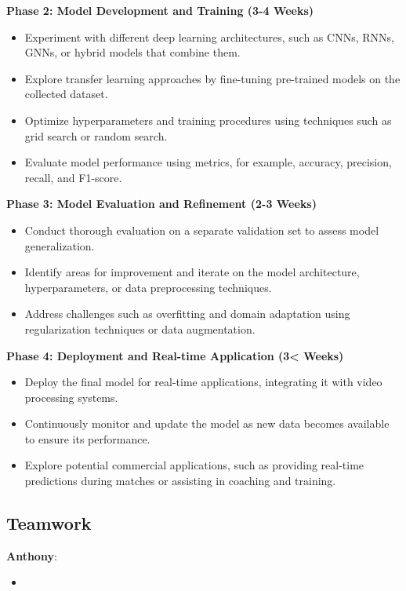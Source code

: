 \documentclass{article}
\begin{document}
{\bf{Phase 2: Model Development and Training (3-4 Weeks)}}
\begin{itemize}
    \item Experiment with different deep learning architectures, such as CNNs, RNNs, GNNs, or hybrid models that combine them.
    \item Explore transfer learning approaches by fine-tuning pre-trained models on the collected dataset.
    \item Optimize hyperparameters and training procedures using techniques such as grid search or random search.
    \item Evaluate model performance using metrics, for example, accuracy, precision, recall, and F1-score.
\end{itemize}

{\bf{Phase 3: Model Evaluation and Refinement (2-3 Weeks)}}
\begin{itemize}
    \item Conduct thorough evaluation on a separate validation set to assess model generalization.
    \item Identify areas for improvement and iterate on the model architecture, hyperparameters, or data preprocessing techniques.
    \item Address challenges such as overfitting and domain adaptation using regularization techniques or data augmentation.
\end{itemize}

{\bf{Phase 4: Deployment and Real-time Application (3< Weeks)}}
\begin{itemize}
    \item Deploy the final model for real-time applications, integrating it with video processing systems.
    \item Continuously monitor and update the model as new data becomes available to ensure its performance.
    \item Explore potential commercial applications, such as providing real-time predictions during matches or assisting in coaching and training.
\end{itemize}

\subsection{Teamwork}
{\bf Anthony}: 
\begin{itemize}
    \item 
\end{itemize}
\end{document}
